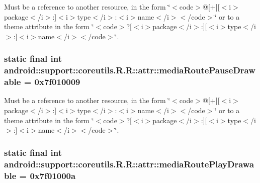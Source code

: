 Must be a reference to another resource, in the form \char`\"{}$<$code$>$@\mbox{[}+\mbox{]}\mbox{[}$<$i$>$package$<$/i$>$:\mbox{]}$<$i$>$type$<$/i$>$:$<$i$>$name$<$/i$>$$<$/code$>$\char`\"{} or to a theme attribute in the form \char`\"{}$<$code$>$?\mbox{[}$<$i$>$package$<$/i$>$:\mbox{]}\mbox{[}$<$i$>$type$<$/i$>$:\mbox{]}$<$i$>$name$<$/i$>$$<$/code$>$\char`\"{}. \hypertarget{classandroid_1_1support_1_1coreutils_1_1_r_1_1attr_7227f83ef76caffc41513cbfdb72d1b1}{
\subsubsection[{mediaRoutePauseDrawable}]{\setlength{\rightskip}{0pt plus 5cm}static final int android::support::coreutils.R.R::attr::mediaRoutePauseDrawable = 0x7f010009}}
\label{classandroid_1_1support_1_1coreutils_1_1_r_1_1attr_7227f83ef76caffc41513cbfdb72d1b1}


Must be a reference to another resource, in the form \char`\"{}$<$code$>$@\mbox{[}+\mbox{]}\mbox{[}$<$i$>$package$<$/i$>$:\mbox{]}$<$i$>$type$<$/i$>$:$<$i$>$name$<$/i$>$$<$/code$>$\char`\"{} or to a theme attribute in the form \char`\"{}$<$code$>$?\mbox{[}$<$i$>$package$<$/i$>$:\mbox{]}\mbox{[}$<$i$>$type$<$/i$>$:\mbox{]}$<$i$>$name$<$/i$>$$<$/code$>$\char`\"{}. \hypertarget{classandroid_1_1support_1_1coreutils_1_1_r_1_1attr_8dadab713d56028593c42d064abe2181}{
\subsubsection[{mediaRoutePlayDrawable}]{\setlength{\rightskip}{0pt plus 5cm}static final int android::support::coreutils.R.R::attr::mediaRoutePlayDrawable = 0x7f01000a}}
\label{classandroid_1_1support_1_1coreutils_1_1_r_1_1attr_8dadab713d56028593c42d064abe2181}


